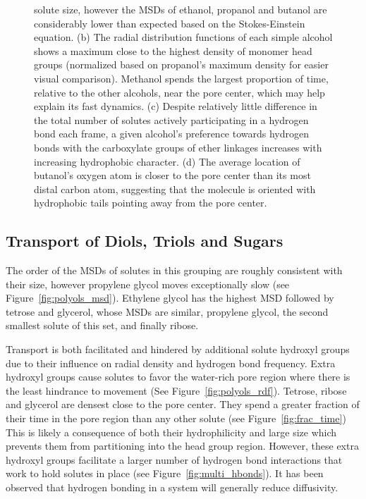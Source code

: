 \documentclass[journal=jpcbfk,manuscript=article]{achemso}
\begin{document}
\begin{figure}[!htb]
{  solute size, however the MSDs of ethanol, propanol and butanol are considerably
  lower than expected based on the Stokes-Einstein equation. (b) The radial 
  distribution functions of each simple alcohol shows a maximum close to the
  highest density of monomer head groups (normalized based on propanol's maximum
  density for easier visual comparison). Methanol spends the largest proportion 
  of time, relative to the other alcohols, near the pore center, which may help
  explain its fast dynamics. (c) Despite relatively little difference in the 
  total number of solutes actively participating in a hydrogen bond each frame,
  a given alcohol's preference towards hydrogen bonds with the carboxylate groups
  of ether linkages increases with increasing hydrophobic character. (d) The average location of 
  butanol's oxygen atom is closer to the pore center than its most distal carbon
  atom, suggesting that the molecule is oriented with hydrophobic tails pointing
  away from the pore center.}\label{fig:simple_alcohols}
  \end{figure}

  \subsection{Transport of Diols, Triols and Sugars}\label{section:polyols}
  
  The order of the MSDs of solutes in this grouping are roughly consistent with 
  their size, however propylene glycol moves exceptionally slow (see 
  Figure~\ref{fig:polyols_msd}). Ethylene glycol has the highest MSD followed
  by tetrose and glycerol, whose MSDs are similar, propylene glycol, the second
  smallest	solute of this set, and finally ribose.
  
  Transport is both facilitated and hindered by additional solute hydroxyl groups
  due to their influence on radial density and hydrogen bond frequency. Extra 
  hydroxyl groups cause solutes to favor the water-rich pore region where there 
  is the least hindrance to movement (See Figure~\ref{fig:polyols_rdf}). Tetrose,
  ribose and glycerol are densest close to the pore center. They spend a greater
  fraction of their time in the pore region than any other solute (see 
  Figure~\ref{fig:frac_time}) This is likely a consequence of both their 
  hydrophilicity and large size which prevents them from partitioning into the 
  head group region. However, these extra hydroxyl groups facilitate a larger 
  number of hydrogen bond interactions that work to hold solutes in place (see 
  Figure~\ref{fig:multi_hbonds}). It has been observed that hydrogen bonding 
  in a system will generally reduce diffusivity.~\cite{srinivas_computer_1999}
  
\end{document}
